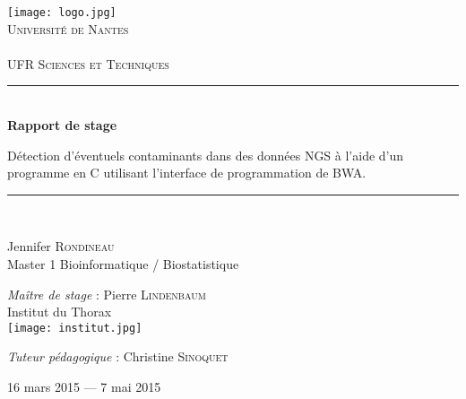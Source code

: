 \setlength{\parindent}{0cm}
\setlength{\parskip}{1ex plus 0.5ex minus 0.2ex}
\newcommand{\hsp}{\hspace{20pt}}
\newcommand{\HRule}{\rule{\linewidth}{0.5mm}}
\begin{titlepage}
  \begin{sffamily}
  \begin{center}

    \texttt{[image: logo.jpg]}~\\[1.5cm]

    \textsc{\LARGE Université de Nantes}\\
    \textsc{\LARGE  }\\
    \textsc{\Large UFR Sciences et Techniques}\\[1.5cm]

    \HRule \\[0.4cm]
    { \huge \bfseries Rapport de stage\\[0.4cm]
     }
     \begin{center}
		Détection d'éventuels contaminants dans des données NGS à l'aide d'un programme en C utilisant l'interface de programmation de BWA.
	\end{center}
    \HRule \\[0.4cm]

    
      \begin{center} \large
       Jennifer \textsc{Rondineau}\\
       Master 1 Bioinformatique / Biostatistique \\
      \end{center}
      \begin{center} \large
		\emph{Maître de stage} : Pierre \textsc{Lindenbaum}\\
		Institut du Thorax\ \\
		\texttt{[image: institut.jpg]}\\
      \end{center}
      \begin{center} \large
		\emph{Tuteur pédagogique} : Christine \textsc{Sinoquet} \\
      \end{center}

    \vfill

    {\large 16 mars 2015 — 7 mai 2015}

  \end{center}
  \end{sffamily}
\end{titlepage}
